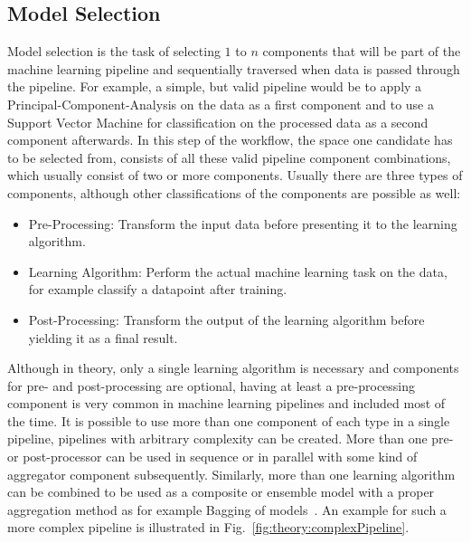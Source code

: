 \subsection{Model Selection}
\label{sec:theory:automl:selection}
Model selection is the task of selecting $1$ to $n$ components that will be part of the machine learning pipeline and sequentially traversed when data is passed through the pipeline.
For example, a simple, but valid pipeline would be to apply a Principal-Component-Analysis on the data as a first component and to use a Support Vector Machine for classification on the processed data as a second component afterwards.
In this step of the workflow, the space one candidate has to be selected from, consists of all these valid pipeline component combinations, which usually consist of two or more components.\newline
Usually there are three types of components, although other classifications of the components are possible as well:
\begin{itemize}
    \item Pre-Processing: Transform the input data before presenting it to the learning algorithm.
    \item Learning Algorithm: Perform the actual machine learning task on the data, for example classify a datapoint after training.
    \item Post-Processing: Transform the output of the learning algorithm before yielding it as a final result.
\end{itemize}
Although in theory, only a single learning algorithm is necessary and components for pre- and post-processing are optional, having at least a pre-processing component is very common in machine learning pipelines and included most of the time.\newline
It is possible to use more than one component of each type in a single pipeline, pipelines with arbitrary complexity can be created.
More than one pre- or post-processor can be used in sequence or in parallel with some kind of aggregator component subsequently.
Similarly, more than one learning algorithm can be combined to be used as a composite or ensemble model with a proper aggregation method as for example Bagging of models~\cite{Breiman-BaggingPredictors}.
An example for such a more complex pipeline is illustrated in Fig.~\ref{fig:theory:complexPipeline}.
